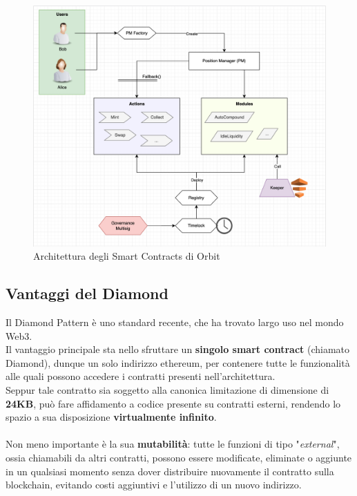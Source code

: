 \documentclass[12pt,a4paper]{report}
\begin{document}
\begin{figure}[H]
  \includegraphics[scale=0.40]{contracts_flow.png}
  \centering
  \caption{Architettura degli Smart Contracts di Orbit}
  \label{fig:contracts_flow}
\end{figure}


\subsection{Vantaggi del Diamond}

Il Diamond Pattern è uno standard recente, che ha trovato largo uso nel mondo Web3.
\\Il vantaggio principale sta nello sfruttare un \textbf{singolo smart contract} (chiamato Diamond), dunque un solo indirizzo ethereum, per contenere tutte le funzionalità alle quali possono accedere i contratti presenti nell'architettura.
\\Seppur tale contratto sia soggetto alla canonica limitazione di dimensione di \textbf{24KB}, può fare affidamento a codice presente su contratti esterni, rendendo lo spazio a sua disposizione \textbf{virtualmente infinito}. 
\\\\Non meno importante è la sua \textbf{mutabilità}: tutte le funzioni di tipo "\textit{external}", ossia chiamabili da altri contratti, possono essere modificate, eliminate o aggiunte in un qualsiasi momento senza dover distribuire nuovamente il contratto sulla blockchain, evitando costi aggiuntivi e l'utilizzo di un nuovo indirizzo.
\end{document}
